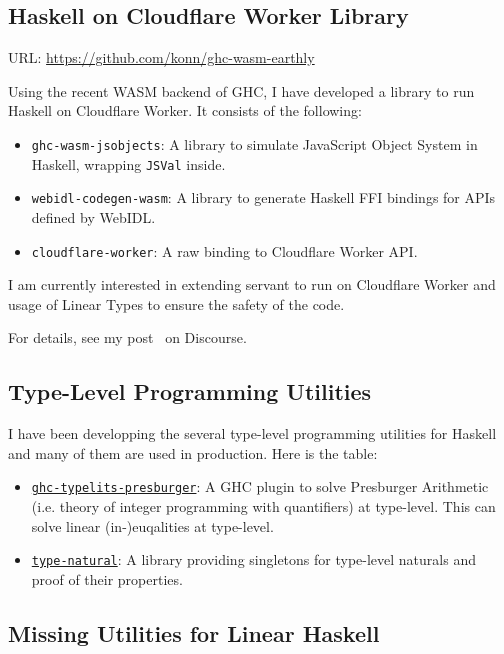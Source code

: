 \documentclass{moderncv}
\begin{document}
\subsection{Haskell on Cloudflare Worker Library}
URL: \url{https://github.com/konn/ghc-wasm-earthly}

Using the recent WASM backend of GHC, I have developed a library to run Haskell on Cloudflare Worker.
It consists of the following:

\begin{itemize}
  \item \texttt{ghc-wasm-jsobjects}: A library to simulate JavaScript Object System in Haskell, wrapping \texttt{JSVal} inside.
  \item \texttt{webidl-codegen-wasm}: A library to generate Haskell FFI bindings for APIs defined by WebIDL.
  \item \texttt{cloudflare-worker}: A raw binding to Cloudflare Worker API.
\end{itemize}

I am currently interested in extending servant to run on Cloudflare Worker and usage of Linear Types to ensure the safety of the code.

For details, see my post~\cite{ISHII:2024ws} on Discourse.

\subsection{Type-Level Programming Utilities}

I have been developping the several type-level programming utilities for Haskell and many of them are used in production.
Here is the table:

\begin{itemize}
  \item \href{http://hackage.haskell.org/package/ghc-typelits-presburger}{\texttt{ghc-typelits-presburger}}: A GHC plugin to solve Presburger Arithmetic (i.e. theory of integer programming with quantifiers) at type-level. This can solve linear (in-)euqalities at type-level.
  \item \href{http://hackage.haskell.org/package/type-natural}{\texttt{type-natural}}: A library providing singletons for type-level naturals and proof of their properties.
\end{itemize}

\subsection{Missing Utilities for Linear Haskell}
\end{document}
